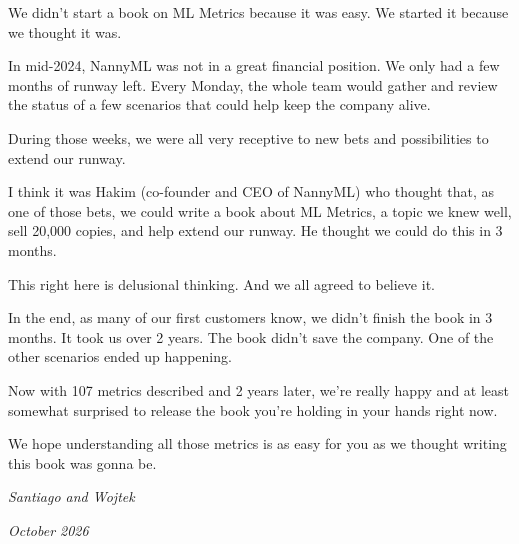 We didn't start a book on ML Metrics because it was easy. We started it because we thought it was.

In mid-2024, NannyML was not in a great financial position. We only had a few months of runway left. Every Monday, the whole team would gather and review the status of a few scenarios that could help keep the company alive.

During those weeks, we were all very receptive to new bets and possibilities to extend our runway.

I think it was Hakim (co-founder and CEO of NannyML) who thought that, as one of those bets, we could write a book about ML Metrics, a topic we knew well, sell 20,000 copies, and help extend our runway. He thought we could do this in 3 months.

This right here is delusional thinking. And we all agreed to believe it.

In the end, as many of our first customers know, we didn't finish the book in 3 months. It took us over 2 years. The book didn't save the company. One of the other scenarios ended up happening.

Now with 107 metrics described and 2 years later, we're really happy and at least somewhat surprised to release the book you're holding in your hands right now.

We hope understanding all those metrics is as easy for you as we thought writing this book was gonna be.

\vspace{10pt}
{\itshape Santiago and Wojtek\par}
{\itshape October 2026\par}
